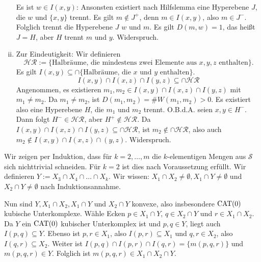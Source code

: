 \begin{beweis}
\begin{enumerate}[(i)]
\begin{minipage}{0.2\textwidth}
\begin{flushright}
			\end{flushright}
		\end{minipage}
		
		Es ist $w \in I(x,y)$:
		Ansonsten existiert nach Hilfslemma eine Hyperebene $J$, die $w$ und $\{x,y\}$ trennt.
		Es gilt $m \notin J^+$, denn $m \in I(x,y)$, also $m \in J^-$.
		Folglich trennt die Hyperebene $J$ $w$ und $m$.
		Es gilt $D(m,w) = 1$, das heißt $J = H$, aber $H$ trennt $m$ und $y$. Widerspruch.
		
		\item Zur Eindeutigkeit:
		Wir definieren
		\[
			\mathcal{HR} := \{\text{Halbräume, die mindestens zwei Elemente aus } x,y,z \text{ enthalten}\}.
		\]
		Es gilt $I(x,y) \subseteq \cap \{\text{Halbräume, die } x \text{ und } y \text{ enthalten}\}$.
		\[
			I(x,y) \cap I(x,z) \cap I(y,z) \subseteq \cap \mathcal{HR}
		\]
		Angenommen, es existieren $m_1,m_2 \in I(x,y) \cap I(x,z) \cap I(y,z)$ mit $m_1 \neq m_2$.
		Da $m_1 \neq m_2$, ist $D(m_1,m_2) = \#W(m_1,m_2) > 0$.
		Es existiert also eine Hyperebene $H$, die $m_1$ und $m_2$ trennt.
		O.B.d.A. seien $x,y \in H^-$.
		Dann folgt $H^- \in \mathcal{HR}$, aber $H^+ \notin \mathcal{HR}$.
		Da $I(x,y) \cap I(x,z) \cap I(y,z) \subseteq \cap \mathcal{HR}$, ist $m_2 \notin \cap \mathcal{HR}$, also auch $m_2 \notin I(x,y) \cap I(x,z) \cap(y,z)$.
		Widerspruch. 
	\end{enumerate}
\end{beweis}

\begin{beweis}
	Wir zeigen per Induktion, dass für $k = 2, \dots, m$ die $k$-elementigen Mengen aus $\mathcal{S}$ sich nichttrivial schneiden.
	Für $k=2$ ist dies nach Voraussetzung erfüllt.
	Wir definieren $Y := X_3 \cap X_4 \cap \dots \cap X_k$.
	Wir wissen: $X_1 \cap  X_2 \neq \emptyset, X_1 \cap Y \neq \emptyset$ und $X_2 \cap Y \neq \emptyset$ nach Induktionsannahme.
	
	Nun sind $Y, X_1 \cap X_2, X_1 \cap Y$ und $X_2 \cap Y$ konvexe, also insbesondere $\operatorname{CAT(0)}$ kubische Unterkomplexe.
	Wähle Ecken $p \in X_1 \cap Y$, $q \in X_2 \cap Y$ und $r \in X_1 \cap X_2$.
	Da $Y$ ein $\operatorname{CAT(0)}$ kubischer Unterkomplex ist und $p,q \in Y$, liegt auch $I(p,q) \subseteq Y$.
	Ebenso ist $p,r \in X_1$, also $I(p,r) \subseteq X_1$ und $q,r \in X_2$, also $I(q,r) \subseteq X_2$.
	Weiter ist $I(p,q) \cap I(p,r) \cap I(q,r) = \{m(p,q,r)\}$ und $m(p,q,r) \in Y$.
	Folglich ist $m(p,q,r) \in X_1 \cap X_2 \cap Y$. 
\end{beweis}

